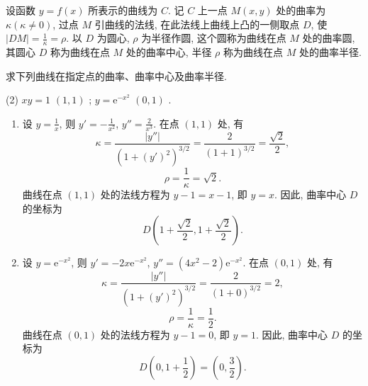 \begin{solution}
\begin{enumerate}
    \end{enumerate}
\end{solution}

\begin{exercise}[3.5.11]
    设函数 $y = f(x)$ 所表示的曲线为 $C$. 记 $C$ 上一点 $M(x, y)$ 处的曲率为 $\kappa (\kappa \ne 0)$, 过点 $M$ 引曲线的法线, 在此法线上曲线上凸的一侧取点 $D$, 使 $|DM| = \frac{1}{\kappa} = \rho$. 以 $D$ 为圆心, $\rho$ 为半径作圆, 这个圆称为曲线在点 $M$ 处的曲率圆, 其圆心 $D$ 称为曲线在点 $M$ 处的曲率中心, 半径 $\rho$ 称为曲线在点 $M$ 处的曲率半径.

    求下列曲线在指定点的曲率、曲率中心及曲率半径.
    \begin{tasks}(2)
        \task $xy = 1$  $(1, 1)$ ;
        \task $y = \mathrm{e}^{-x^2}$  $(0, 1)$ .
    \end{tasks}
\end{exercise}

\begin{solution}
    \begin{enumerate}
        \item 设 $y = \frac{1}{x}$, 则 $y' = -\frac{1}{x^2}$, $y'' = \frac{2}{x^3}$. 在点 $(1, 1)$ 处, 有
              $$\kappa = \frac{|y''|}{(1 + (y')^2)^{3/2}} = \frac{2}{(1 + 1)^{3/2}} = \frac{\sqrt{2}}{2},$$
              $$\rho = \frac{1}{\kappa} = \sqrt{2}.$$
              曲线在点 $(1, 1)$ 处的法线方程为 $y - 1 = x - 1$, 即 $y = x$. 因此, 曲率中心 $D$ 的坐标为
              $$D\left(1 + \frac{\sqrt{2}}{2}, 1 + \frac{\sqrt{2}}{2}\right).$$
        \item 设 $y = \mathrm{e}^{-x^2}$, 则 $y' = -2x \mathrm{e}^{-x^2}$, $y'' = (4x^2 - 2) \mathrm{e}^{-x^2}$. 在点 $(0, 1)$ 处, 有
              $$\kappa = \frac{|y''|}{(1 + (y')^2)^{3/2}} = \frac{2}{(1 + 0)^{3/2}} = 2,$$
              $$\rho = \frac{1}{\kappa} = \frac{1}{2}.$$
              曲线在点 $(0, 1)$ 处的法线方程为 $y - 1 = 0$, 即 $y = 1$. 因此, 曲率中心 $D$ 的坐标为
              $$D\left(0, 1 + \frac{1}{2}\right) = (0, \frac{3}{2}).$$
    \end{enumerate}
\end{solution}

